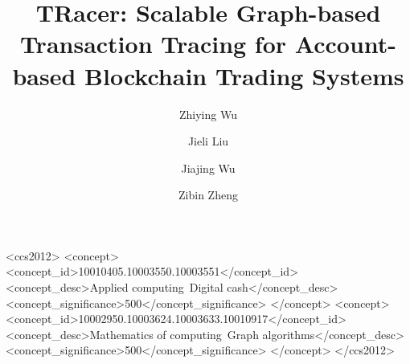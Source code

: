 \documentclass[sigconf]{acmart}
\begin{document}
\title{TRacer: Scalable Graph-based Transaction Tracing for Account-based Blockchain Trading Systems}

\author{Zhiying Wu}
\authornotemark[1]

\author{Jieli Liu}

\author{Jiajing Wu}

\author{Zibin Zheng}


\renewcommand{\shortauthors}{Zhiying Wu and Jieli Liu, et al.}

\begin{abstract}
  
\end{abstract}

\begin{CCSXML}
<ccs2012>
    <concept>
        <concept_id>10010405.10003550.10003551</concept_id>
        <concept_desc>Applied computing~Digital cash</concept_desc>
        <concept_significance>500</concept_significance>
    </concept>
    <concept>
        <concept_id>10002950.10003624.10003633.10010917</concept_id>
        <concept_desc>Mathematics of computing~Graph algorithms</concept_desc>
        <concept_significance>500</concept_significance>
    </concept>
</ccs2012>
\end{CCSXML}
\end{document}
